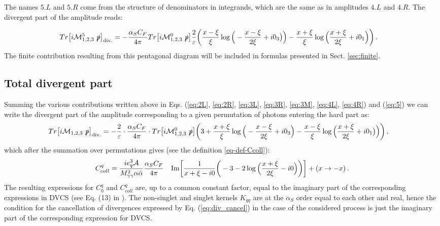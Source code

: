 \documentclass[aps,prd,superscriptaddress,floatfix,showpacs]{revtex4}
\begin{document}
The names $5.L$ and $5.R$ come from the structure of denominators in integrands, which are the same as in amplitudes $4.L$ and $4.R$. The divergent part of the amplitude reads:

\begin{equation}
\begin{aligned}
	&Tr\big[ i\mathcal{M}^5_{1,2,3}~\slashed{p}\big]_{\mathrm{div.}} =- \frac{\alpha_S C_F}{4\pi} Tr\big[ i\mathcal{M}^0_{1,2,3}~\slashed{p}\big]
\frac{2}{\varepsilon} 
\bigg(  \frac{x-\xi}{\xi}\log \Big{(}- \frac{x -\xi}{2\xi}+ i0_3\big{)} \Big{)} 
- \frac{x+\xi}{\xi}\log \Big{(} \frac{x+\xi}{2\xi} + i0_1 \Big{)} \bigg)\,.
\end{aligned}
\label{eq:5}
\end{equation}
The finite contribution resulting from this pentagonal diagram will be included in formulas presented in Sect. \ref{sec:finite}.

\subsection{Total divergent part}
Summing the various contributions written above in Eqs. (\ref{eq:2L}, \ref{eq:2R}, \ref{eq:3L}, \ref{eq:3R}, \ref{eq:3M}, \ref{eq:4L}, \ref{eq:4R}) and (\ref{eq:5})
we can write the divergent part of the amplitude corresponding to a given permutation of photons entering the hard part as:
\begin{equation}
\begin{aligned}
	&Tr\big[ i\mathcal{M}_{1,2,3}~\slashed{p}\big]_{\mathrm{div.}} = -\frac{2}{\varepsilon} \cdot \frac{\alpha_S C_F}{4\pi} \cdot Tr\big[ i\mathcal{M}^0_{1,2,3}~\slashed{p}\big]
\bigg( 3
+\frac{x+\xi}{\xi}\log \Big{(} 
        -\frac{x-\xi}{2\xi} + i0_3 \Big{)} 
- \frac{x-\xi}{\xi}\log \Big{(} \frac{x+\xi}{2\xi} + i0_1\big{)} \Big{)} \bigg) \,,
\end{aligned}
\end{equation}
which after the summation over permutations gives (see the definition \eqref{eq-def-Ccoll}):
\begin{equation}\label{eq-Cqcoll-fin}
\begin{aligned}
&C^q_{coll} = \frac{i e_q^3 \mathcal{A}}{ M^2_{\gamma\gamma} \alpha \bar{\alpha} } \frac{\alpha_S C_F}{4\pi} 
&  \mathrm{Im} \bigg[ \frac{1}{x+\xi-i0} \bigg( -3- 2
\log \Big{(} \frac{x+\xi}{2\xi} - i0 \Big{)}  \bigg) \bigg] + (x \rightarrow -x)\,.
\end{aligned}
\end{equation}
The resulting expressions for $C_0^q$ and $C_{coll}^q$ are, up to a common constant factor, equal to the imaginary part of the corresponding expressions in DVCS (see Eq. (13) in \cite{Moutarde:2013qs}). The non-singlet and singlet kernels $K_{qq}$ are at the $\alpha_S$ order equal to each other \cite{Diehl:2003ny} and real, hence the condition for the cancellation of divergences expressed by Eq. (\ref{eq:div_cancel}) in the case of the considered process is just the imaginary part of the corresponding expression for DVCS. 
\end{document}
